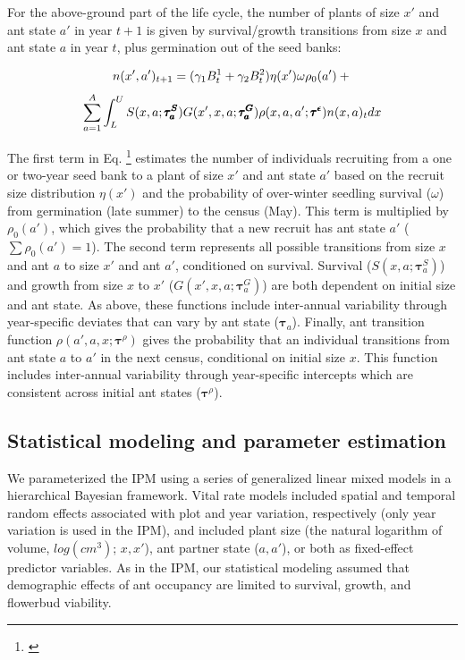 \documentclass[11pt]{article}
\newcommand{\tom}[2]{{\color{red}{#1}}\footnote{\textit{\color{red}{#2}}}}
\begin{document}
For the above-ground part of the life cycle, the number of plants of size $x'$ and ant state $a'$ in year $t+1$ is given by survival/growth transitions from size $x$ and ant state $a$ in year $t$, plus germination out of the seed banks:
\begin{linenomath*}
	$$
	n(x',a')_{t+1} = (\gamma_1 B^1_{t} + \gamma_2 B^2_{t} ) \eta(x') \omega \rho_{0}(a')  + \\
	$$
	$$
	\sum_{a=1}^{A} \int_L^U S(x,a;\pmb{\tau^S_{a}}) G(x',x,a;\pmb{\tau^G_{a}}) \rho(x,a,a';\pmb{\tau^{\epsilon}}) n(x,a)_t dx \\
	$$
	\label{eqn:IPM2}
\end{linenomath*}

\noindent The first term in Eq. \tom{\ref{eqn:IPM2}}{We should label s. I am not sure why the equation label is not working here and I did not try to figure it out. It is probably something with the linenomath formatting.} estimates the number of individuals recruiting from a one or two-year seed bank to a plant of size $x'$ and ant state $a'$ based on the recruit size distribution $\eta(x')$ and the probability of over-winter seedling survival ($\omega$) from germination (late summer) to the census (May).
This term is multiplied by $\rho_{0}(a')$, which gives the probability that a new recruit has ant state $a'$ ($\sum\rho_{0}(a')=1$). 
The second term represents all possible transitions from size $x$ and ant $a$ to size $x'$ and ant $a'$, conditioned on survival. 
Survival ($S(x,a;\pmb{\tau}^S_{a})$) and growth from size $x$ to $x'$ ($G(x',x,a;\pmb{\tau}^G_{a})$) are both dependent on initial size and ant state. 
As above, these functions include inter-annual variability through year-specific deviates that can vary by ant state ($\pmb{\tau}_{a}$). 
Finally, ant transition function $\rho(a',a,x;\pmb{\tau}^{\rho})$ gives the probability that an individual transitions from ant state $a$ to $a'$ in the next census, conditional on initial size $x$. 
This function includes inter-annual variability through year-specific intercepts which are consistent across initial ant states ($\pmb{\tau}^\rho$).

\subsection*{Statistical modeling and parameter estimation}
We parameterized the IPM using a series of generalized linear mixed models in a hierarchical Bayesian framework. 
Vital rate models included spatial and temporal random effects associated with plot and year variation, respectively (only year variation is used in the IPM), and included plant size (the natural logarithm of volume, $log(cm^3)$; $x,x'$), ant partner state ($a,a'$), or both as fixed-effect predictor variables. 
As in the IPM, our statistical modeling assumed that demographic effects of ant occupancy are limited to survival, growth, and flowerbud viability. 
\end{document}

